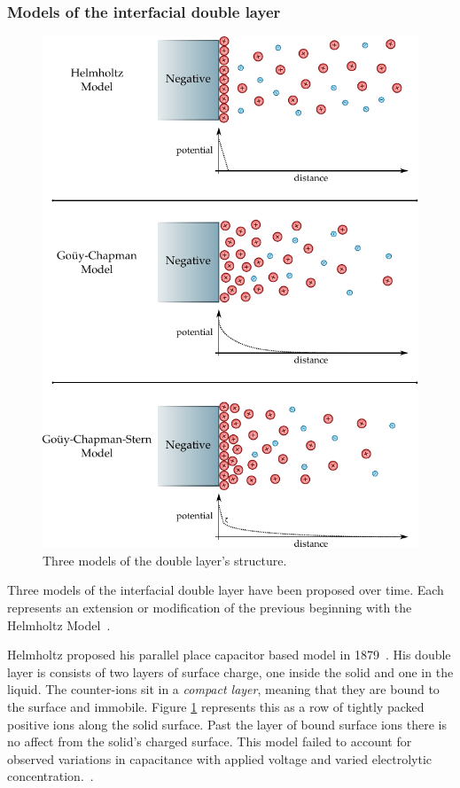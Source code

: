   \subsubsection*{Models of the interfacial double layer}

    \begin{figure}
      \begin{center}
        \includegraphics{content/introduction/graphics/doubleLayerModels}
      \end{center}
      \caption{Three models of the double layer's structure.}
      \label{fig:doubleLayerModels}
    \end{figure}
  
    Three models of the interfacial double layer have been proposed over time.
    Each represents an extension or modification of the previous beginning with the Helmholtz Model~\cite{Horch2004}.

    Helmholtz proposed his parallel place capacitor based model in 1879~\cite{Geddes1997}.
    His double layer is consists of two layers of surface charge, one inside the solid and one in the liquid.
    The counter-ions sit in a \emph{compact layer}, meaning that they are bound to the surface and immobile.
    Figure \ref{fig:doubleLayerModels} represents this as a row of tightly packed positive ions along the solid surface.
    Past the layer of bound surface ions there is no affect from the solid's charged surface.
    This model failed to account for observed variations in capacitance with applied voltage and varied electrolytic concentration.~\cite{Bard1980}.

